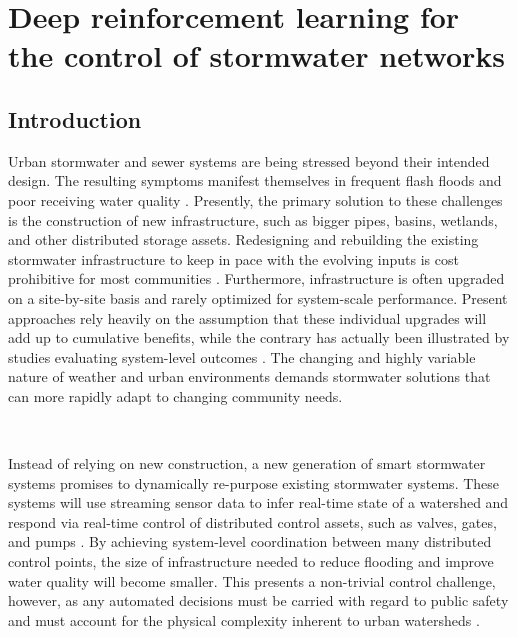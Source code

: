 \chapter{Deep reinforcement learning for
the control of stormwater
networks}\label{ch:rl}

\vspace{1cm}

\section{Introduction}

Urban stormwater and sewer systems are being stressed beyond their intended design.
The resulting symptoms manifest themselves in frequent flash floods \cite{LarisKarklisBefore-and-afterPost} and poor receiving water quality \cite{Watson2016TheHypoxia}.
Presently, the primary solution to these challenges is the construction of new infrastructure, such as bigger pipes, basins, wetlands, and other distributed storage assets.
Redesigning and rebuilding the existing stormwater infrastructure to keep in pace with the evolving inputs is cost prohibitive for most communities \cite{Kerkez2016SmarterSystems}.
Furthermore, infrastructure is often upgraded on a site-by-site basis and rarely optimized for system-scale performance.
Present approaches rely heavily on the assumption that these individual upgrades will add up to cumulative benefits, while the contrary has actually been illustrated by studies evaluating system-level outcomes \cite{Emerson2005Watershed-ScaleBasins}.
The changing and highly variable nature of weather and urban environments demands stormwater solutions that can more rapidly adapt to changing community needs.

\

Instead of relying on new construction, a new generation of smart stormwater systems promises to dynamically re-purpose existing stormwater systems.
These systems will use streaming sensor data to infer real-time state of a watershed and respond via real-time control of distributed control assets, such as valves, gates, and pumps \cite{Kerkez2016SmarterSystems}.
By achieving system-level coordination between many distributed control points, the size of infrastructure needed to reduce flooding and improve water quality will become smaller.
This presents a non-trivial control challenge, however, as any automated decisions must be carried with regard to public safety and must account for the physical complexity inherent to urban watersheds \cite{Mullapudi2017, Schutze2004RealToday}.

